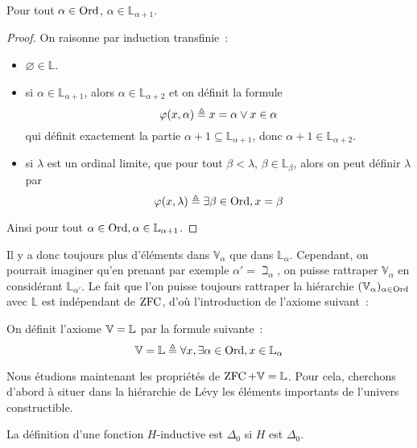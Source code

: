 \begin{proposition}
  Pour tout $\alpha \in \operatorname{Ord}$, $\alpha \in \mathbb L_{\alpha + 1}$.
\end{proposition}

\begin{proof}
  On raisonne par induction transfinie~:
  \begin{itemize}
  \item $\varnothing \in \mathbb L$.
  \item si $\alpha \in \mathbb L_{\alpha + 1}$,
    alors $\alpha \in \mathbb L_{\alpha + 2}$ et on définit la formule
    \[\varphi(x,\alpha) \triangleq x = \alpha \lor x \in \alpha\]
    qui définit exactement la partie
    $\alpha + 1 \subseteq \mathbb L_{\alpha + 1}$, donc
    $\alpha + 1 \in \mathbb L_{\alpha + 2}$.
  \item si $\lambda$ est un ordinal limite, que pour tout $\beta < \lambda$,
    $\beta \in \mathbb L_\beta$, alors on peut définir $\lambda$ par
    \[\varphi(x,\lambda) \triangleq \exists \beta\in \operatorname{Ord}, x = \beta\]
  \end{itemize}
  Ainsi pour tout $\alpha \in \operatorname{Ord}, \alpha \in \mathbb L_{\alpha + 1}$.
\end{proof}

Il y a donc toujours plus d'éléments dans $\mathbb V_\alpha$ que dans
$\mathbb L_\alpha$. Cependant, on pourrait imaginer qu'en prenant par exemple
$\alpha' = \beth_\alpha$, on puisse rattraper $\mathbb V_\alpha$ en considérant
$\mathbb L_{\alpha'}$. Le fait que l'on puisse toujours rattraper la hiérarchie
$(\mathbb V_{\alpha})_{\alpha\in\operatorname{Ord}}$ avec $\mathbb L$ est indépendant de $\operatorname{ZFC}$,
d'où l'introduction de l'axiome suivant~:

\begin{axiom}[V = L]\label{ax.VeqL}
  On définit l'axiome $\mathbb V = \mathbb L$ par la formule suivante~:
  \[\mathbb V = \mathbb L \triangleq \forall x, \exists \alpha \in \operatorname{Ord}, x \in \mathbb L_\alpha\]
\end{axiom}

Nous étudions maintenant les propriétés de $\operatorname{ZFC}+\mathbb V = \mathbb L$. Pour cela, cherchons
d'abord à situer dans la hiérarchie de Lévy les éléments importants de l'univers
constructible.

\begin{property}
  La définition d'une fonction $H$-inductive est $\Delta_0$ si $H$ est
  $\Delta_0$.
\end{property}

